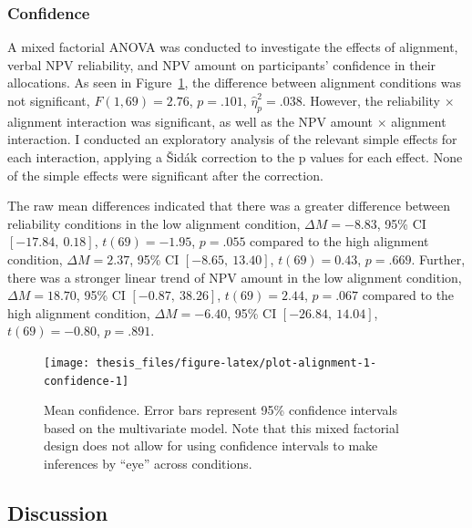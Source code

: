 \documentclass[a4paper, nobind, dvipsnames]{templates/ociamthesis}
\theoremstyle{definition}
\theoremstyle{definition}
\theoremstyle{definition}
\theoremstyle{definition}
\theoremstyle{remark}
\begin{document}
\hypertarget{confidence-2}{%
\subsubsection{Confidence}\label{confidence-2}}

A mixed factorial ANOVA was conducted to investigate the effects of alignment,
verbal NPV reliability, and NPV amount on participants' confidence in their
allocations. As seen in Figure~\ref{fig:plot-alignment-1-confidence}, the
difference between alignment conditions was not significant,
\(F(1, 69) = 2.76\), \(p = .101\), \(\hat{\eta}^2_p = .038\). However, the reliability \(\times\)
alignment interaction was significant, as well as the NPV amount \(\times\)
alignment interaction. I conducted an exploratory analysis of the relevant
simple effects for each interaction, applying a Šidák correction to the p values
for each effect. None of the simple effects were significant after the
correction.

The raw mean differences indicated that there was a greater difference between
reliability conditions in the low alignment condition,
\(\Delta M = -8.83\), 95\% CI \([-17.84,~0.18]\), \(t(69) = -1.95\), \(p = .055\) compared to the high alignment
condition, \(\Delta M = 2.37\), 95\% CI \([-8.65,~13.40]\), \(t(69) = 0.43\), \(p = .669\). Further, there was
a stronger linear trend of NPV amount in the low alignment condition,
\(\Delta M = 18.70\), 95\% CI \([-0.87,~38.26]\), \(t(69) = 2.44\), \(p = .067\) compared to the high alignment
condition, \(\Delta M = -6.40\), 95\% CI \([-26.84,~14.04]\), \(t(69) = -0.80\), \(p = .891\).



\begin{figure}
\texttt{[image: thesis\_files/figure-latex/plot-alignment-1-confidence-1]} \caption{Mean confidence. Error bars represent 95\% confidence intervals based on the multivariate model. Note that this mixed factorial design does not allow for using confidence intervals to make inferences by ``eye'' across conditions.}\label{fig:plot-alignment-1-confidence}
\end{figure}

\hypertarget{discussion-9}{%
\subsection{Discussion}\label{discussion-9}}
\end{document}
